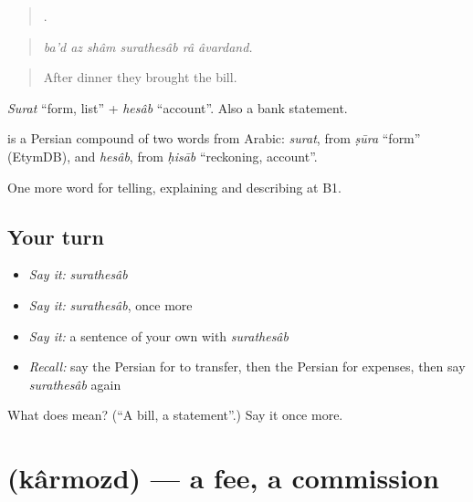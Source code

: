\begin{quote}
     .
\end{quote}

\begin{quote}
\emph{ba'd az shâm surathesâb râ âvardand.}
\end{quote}

\begin{quote}
After dinner they brought the bill.
\end{quote}

\emph{Surat} \textquotedblleft{}form, list\textquotedblright{} + \emph{hesâb} \textquotedblleft{}account\textquotedblright{}. Also a bank statement.

\begin{cousinweb}
\textbf{} is a Persian compound of two words from Arabic: \emph{surat}, from \emph{ṣūra} \textquotedblleft{}form\textquotedblright{} (EtymDB), and \emph{hesâb}, from \emph{ḥisāb} \textquotedblleft{}reckoning, account\textquotedblright{}.
\end{cousinweb}

\begin{grammarlens}[title={What you've built}]
One more word for telling, explaining and describing at B1.
\end{grammarlens}

\subsection*{Your turn}
\begin{itemize}
\raggedright
  \item \emph{Say it:} \emph{surathesâb}
  \item \emph{Say it:} \emph{surathesâb}, once more
  \item \emph{Say it:} a sentence of your own with \emph{surathesâb}
  \item \emph{Recall:} say the Persian for to transfer, then the Persian for expenses, then say \emph{surathesâb} again
\end{itemize}

\begin{tcolorbox}[breakable,colback=teal!4,colframe=teal!35!black,title={Before you move on}]
What does  mean? (\textquotedblleft{}A bill, a statement\textquotedblright{}.) Say it once more.
\end{tcolorbox}
\section[\texorpdfstring{\fa{کارمزد} (kârmozd)}{کارمزد (kârmozd)}]{ (kârmozd) — a fee, a commission}

